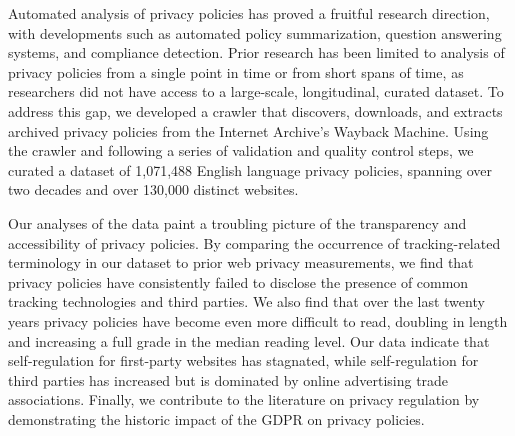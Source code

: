 Automated analysis of privacy policies has proved a fruitful research direction, with developments such as automated policy summarization, question answering systems, and compliance detection. Prior research has been limited to analysis of privacy policies from a single point in time or from short spans of time, as researchers did not have access to a large-scale, longitudinal, curated dataset. To address this gap, we developed a crawler that discovers, downloads, and extracts archived privacy policies from the Internet Archive’s Wayback Machine. Using the crawler and following a series of validation and quality control steps, we curated a dataset of 1,071,488 English language privacy policies, spanning over two decades and over 130,000 distinct websites. 

Our analyses of the data paint a troubling picture of the transparency and accessibility of privacy policies. By comparing the occurrence of tracking-related terminology in our dataset to prior web privacy measurements, we find that privacy policies have consistently failed to disclose the presence of common tracking technologies and third parties. We also find that over the last twenty years privacy policies have become even more difficult to read, doubling in length and increasing a full grade in the median reading level. Our data indicate that self-regulation for first-party websites has stagnated, while self-regulation for third parties has increased but is dominated by online advertising trade associations. Finally, we contribute to the literature on privacy regulation by demonstrating the historic impact of the GDPR on privacy policies.
